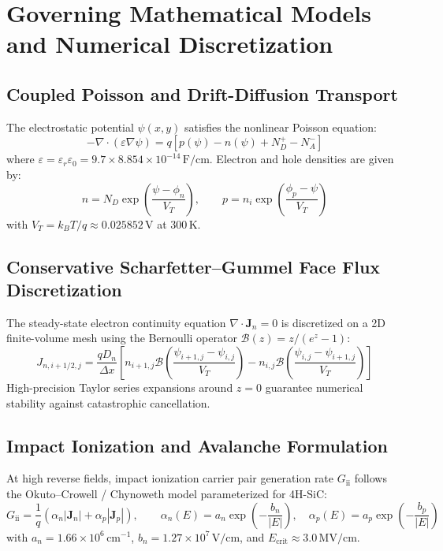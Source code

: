 \documentclass[10pt,a4paper]{article}
\begin{document}
\section{Governing Mathematical Models and Numerical Discretization}

\subsection{Coupled Poisson and Drift-Diffusion Transport}
The electrostatic potential $\psi(x, y)$ satisfies the nonlinear Poisson equation:
\begin{equation}
-\nabla \cdot (\varepsilon \nabla \psi) = q \left[ p(\psi) - n(\psi) + N_D^+ - N_A^- \right]
\end{equation}
where $\varepsilon = \varepsilon_r \varepsilon_0 = 9.7 \times 8.854 \times 10^{-14}\,\mathrm{F/cm}$. Electron and hole densities are given by:
\begin{equation}
n = N_D \exp\left( \frac{\psi - \phi_n}{V_T} \right), \qquad p = n_i \exp\left( \frac{\phi_p - \psi}{V_T} \right)
\end{equation}
with $V_T = k_B T / q \approx 0.025852\,\mathrm{V}$ at $300\,\mathrm{K}$.

\subsection{Conservative Scharfetter--Gummel Face Flux Discretization}
The steady-state electron continuity equation $\nabla \cdot \mathbf{J}_n = 0$ is discretized on a 2D finite-volume mesh using the Bernoulli operator $\mathcal{B}(z) = z / (e^z - 1)$:
\begin{equation}
J_{n, i+1/2, j} = \frac{q D_n}{\Delta x} \left[ n_{i+1, j} \mathcal{B}\left(\frac{\psi_{i+1, j} - \psi_{i, j}}{V_T}\right) - n_{i, j} \mathcal{B}\left(\frac{\psi_{i, j} - \psi_{i+1, j}}{V_T}\right) \right]
\end{equation}
High-precision Taylor series expansions around $z = 0$ guarantee numerical stability against catastrophic cancellation.

\subsection{Impact Ionization and Avalanche Formulation}
At high reverse fields, impact ionization carrier pair generation rate $G_{\mathrm{ii}}$ follows the Okuto--Crowell / Chynoweth model parameterized for 4H-SiC:
\begin{equation}
G_{\mathrm{ii}} = \frac{1}{q} \left( \alpha_n |\mathbf{J}_n| + \alpha_p |\mathbf{J}_p| \right), \qquad \alpha_n(E) = a_n \exp\left(-\frac{b_n}{|E|}\right), \quad \alpha_p(E) = a_p \exp\left(-\frac{b_p}{|E|}\right)
\end{equation}
with $a_n = 1.66 \times 10^6\,\mathrm{cm}^{-1}$, $b_n = 1.27 \times 10^7\,\mathrm{V/cm}$, and $E_{\mathrm{crit}} \approx 3.0\,\mathrm{MV/cm}$.
\end{document}
